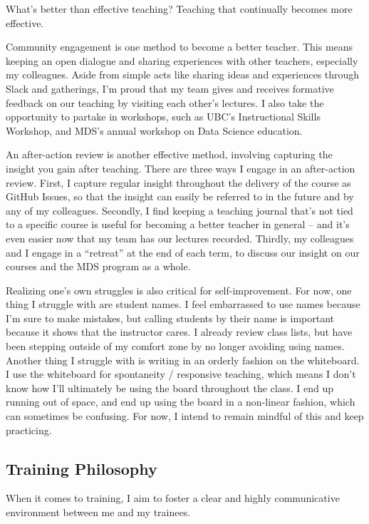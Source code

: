 \documentclass[]{article}
\begin{document}
What's better than effective teaching? Teaching that continually becomes more effective.

Community engagement is one method to become a better teacher. This means keeping an open dialogue and sharing experiences with other teachers, especially my colleagues. Aside from simple acts like sharing ideas and experiences through Slack and gatherings, I'm proud that my team gives and receives formative feedback on our teaching by visiting each other's lectures. I also take the opportunity to partake in workshops, such as UBC's Instructional Skills Workshop, and MDS's annual workshop on Data Science education.

An after-action review is another effective method, involving capturing the insight you gain after teaching. There are three ways I engage in an after-action review. First, I capture regular insight throughout the delivery of the course as GitHub Issues, so that the insight can easily be referred to in the future and by any of my colleagues. Secondly, I find keeping a teaching journal that's not tied to a specific course is useful for becoming a better teacher in general -- and it's even easier now that my team has our lectures recorded. Thirdly, my colleagues and I engage in a ``retreat'' at the end of each term, to discuss our insight on our courses and the MDS program as a whole.

Realizing one's own struggles is also critical for self-improvement. For now, one thing I struggle with are student names. I feel embarrassed to use names because I'm sure to make mistakes, but calling students by their name is important because it shows that the instructor cares. I already review class lists, but have been stepping outside of my comfort zone by no longer avoiding using names. Another thing I struggle with is writing in an orderly fashion on the whiteboard. I use the whiteboard for spontaneity / responsive teaching, which means I don't know how I'll ultimately be using the board throughout the class. I end up running out of space, and end up using the board in a non-linear fashion, which can sometimes be confusing. For now, I intend to remain mindful of this and keep practicing.

\hypertarget{training-philosophy}{%
\subsection{Training Philosophy}\label{training-philosophy}}

When it comes to training, I aim to foster a clear and highly communicative environment between me and my trainees.
\end{document}

